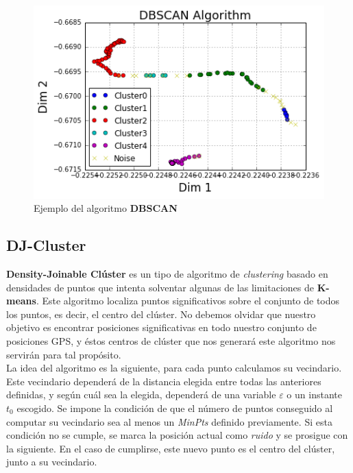 \documentclass[a4paper, 12pt]{article}
\begin{document}
\begin{figure}[H]
	\begin{center}
	\includegraphics[scale=.7]{dbscan_2_0.png}
	\end{center}
	\caption{Ejemplo del algoritmo \textbf{DBSCAN}}
\end{figure}


\subsection{DJ-Cluster}

\textbf{Density-Joinable Cl\'uster}\cite{importantPlaces} es un tipo de algoritmo de \textit{clustering} basado en densidades de puntos que intenta solventar algunas de las limitaciones de \textbf{K-means}. Este algoritmo localiza puntos significativos sobre el conjunto de todos los puntos, es decir, el centro del cl\'uster. No debemos olvidar que nuestro objetivo es encontrar posiciones significativas en todo nuestro conjunto de posiciones GPS, y \'estos centros de cl\'uster que nos generar\'a este algoritmo nos servir\'an para tal prop\'osito. \\

La idea del algoritmo es la siguiente, para cada punto calculamos su vecindario. Este vecindario depender\'a de la distancia elegida entre todas las anteriores definidas, y seg\'un cu\'al sea la elegida, depender\'a de una variable $\varepsilon$ o un instante $t_0$ escogido. Se impone la condici\'on de que el n\'umero de puntos conseguido al computar su vecindario sea al menos un \textit{MinPts} definido previamente. Si esta condici\'on no se cumple, se marca la posici\'on actual como \textit{ruido} y se prosigue con la siguiente. En el caso de cumplirse, este nuevo punto es el centro del cl\'uster, junto a su vecindario.  \\
\end{document}
